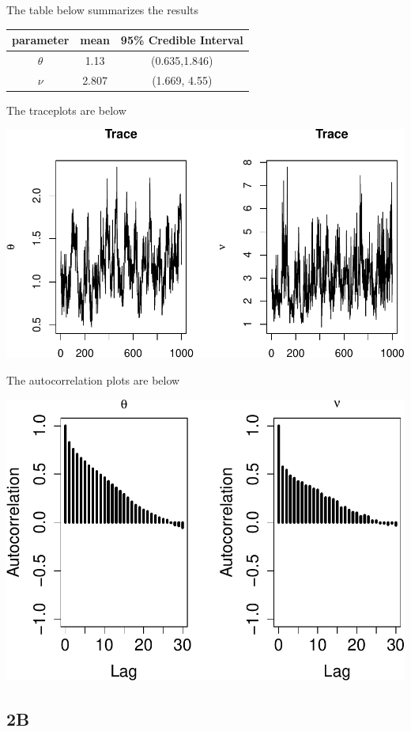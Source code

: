 \documentclass[]{article}
\begin{document}
The table below summarizes the results

\begin{center}
\begin{tabular}{ |c|c|c| }
\hline
 parameter & mean & 95\% Credible Interval \\ 
 \hline
 $\theta$ & 1.13 & (0.635,1.846) \\  
 $\nu$ & 2.807 & (1.669, 4.55)\\
 \hline
\end{tabular}
\end{center}

The traceplots are below

\includegraphics{AMS206b_H4_files/figure-latex/unnamed-chunk-16-1.pdf}

The autocorrelation plots are below

\includegraphics{AMS206b_H4_files/figure-latex/unnamed-chunk-17-1.pdf}

\subsection{2B}\label{b-1}
\end{document}
